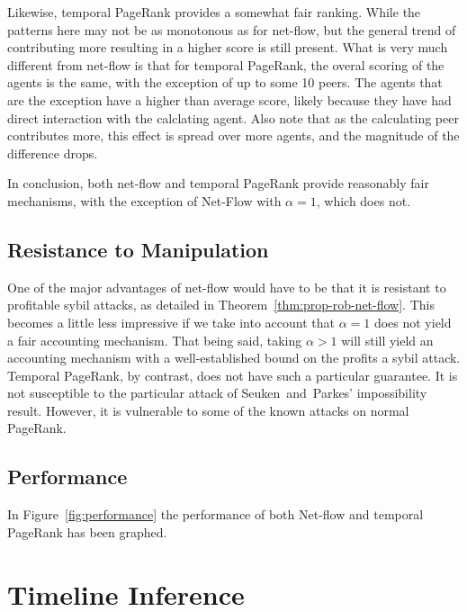 \documentclass[a4paper,11pt]{book}
\theoremstyle{definition}
\begin{document}
Likewise, temporal PageRank provides a somewhat fair ranking. While the patterns here may not be as
monotonous as for net-flow, but the general trend of contributing more resulting in a higher score
is still present. What is very much different from net-flow is that for temporal PageRank, the overal
scoring of the agents is the same, with the exception of up to some 10 peers. The agents that are
the exception have a higher than average score, likely because they have had direct interaction with
the calclating agent. Also note that as the calculating peer contributes more, this effect is spread
over more agents, and the magnitude of the difference drops. 

In conclusion, both net-flow and temporal PageRank provide reasonably fair mechanisms, with the
exception of Net-Flow with $\alpha=1$, which does not.

\section{Resistance to Manipulation}

One of the major advantages of net-flow would have to be that it is resistant to profitable sybil attacks,
as detailed in Theorem~\ref{thm:prop-rob-net-flow}. This becomes a little less impressive if we
take into account that $\alpha=1$ does not yield a fair accounting mechanism. That being said, taking
$\alpha > 1$ will still yield an accounting mechanism with a well-established bound on the profits
a sybil attack. Temporal PageRank, by contrast, does not have such a particular guarantee. It is not
susceptible to the particular attack of Seuken~and~Parkes' impossibility result. However, it is
vulnerable to some of the known attacks on normal PageRank. 

\section{Performance}

In Figure~\ref{fig:performance} the performance of both Net-flow and temporal PageRank has been 
graphed. 

















\appendix

\chapter{Timeline Inference}
\end{document}
